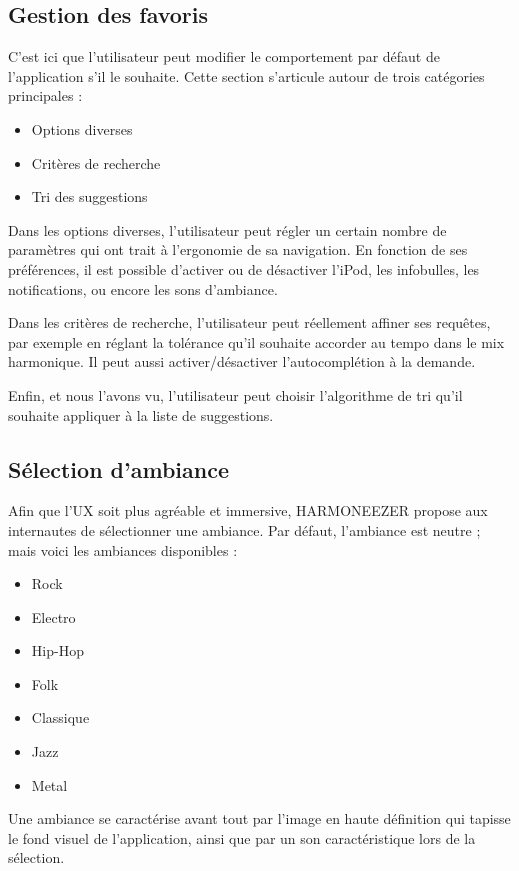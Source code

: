 \documentclass[a4paper,12pt]{article}
\begin{document}
\subsection{Gestion des favoris}

C'est ici que l'utilisateur peut modifier le comportement par défaut de l'application s'il le souhaite. Cette section s'articule autour de trois catégories principales :

\begin{itemize}
 \item{Options diverses}
 \item{Critères de recherche}
 \item{Tri des suggestions}
\end{itemize}

Dans les options diverses, l'utilisateur peut régler un certain nombre de paramètres qui ont trait à l'ergonomie de sa navigation. En fonction de ses préférences, il est possible d'activer ou de désactiver l'iPod, les infobulles, les notifications, ou encore les sons d'ambiance.

Dans les critères de recherche, l'utilisateur peut réellement affiner ses requêtes, par exemple en réglant la tolérance qu'il souhaite accorder au tempo dans le mix harmonique. Il peut aussi activer/désactiver l'autocomplétion à la demande.

Enfin, et nous l'avons vu, l'utilisateur peut choisir l'algorithme de tri qu'il souhaite appliquer à la liste de suggestions.

\subsection{Sélection d'ambiance}

Afin que l'UX soit plus agréable et immersive, HARMONEEZER propose aux internautes de sélectionner une ambiance. Par défaut, l'ambiance est neutre ; mais voici les ambiances disponibles :

\begin{itemize}
 \item{Rock}
 \item{Electro}
 \item{Hip-Hop}
 \item{Folk}
 \item{Classique}
 \item{Jazz}
 \item{Metal}
\end{itemize}

Une ambiance se caractérise avant tout par l'image en haute définition qui tapisse le fond visuel de l'application, ainsi que par un son caractéristique lors de la sélection.
\end{document}
